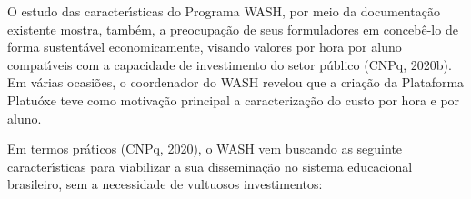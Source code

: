 \documentclass[
12pt,		%
openright,	%
twoside,  %
a4paper,			%
chapter=TITLE,		%
english,			%
french,				%
spanish,			%
brazil				%
]{USPSC-classe/USPSC}
\begin{document}
O estudo das caracter\'{\i}sticas do Programa WASH, por meio da documenta\c{c}\~ao existente mostra, tamb\'em, a preocupa\c{c}\~ao de seus formuladores em conceb\^e-lo de forma sustent\'avel economicamente, visando valores por hora por aluno compat\'{\i}veis com a capacidade de investimento do setor p\'ublico  (CNPq, 2020b). Em v\'arias ocasi\~oes, o coordenador do WASH revelou que a cria\c{c}\~ao da Plataforma Platu\'oxe teve como motiva\c{c}\~ao principal a caracteriza\c{c}\~ao do custo por hora e por aluno.

















Em termos pr\'aticos (CNPq, 2020), o WASH vem buscando as seguinte caracter\'{\i}sticas para viabilizar a sua dissemina\c{c}\~ao no sistema educacional brasileiro, sem a necessidade de vultuosos investimentos:
\end{document}
